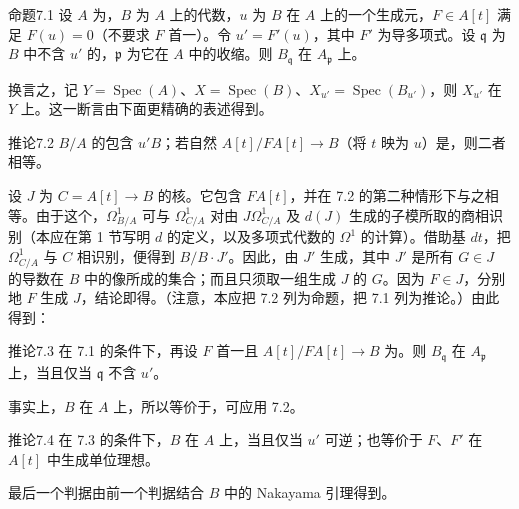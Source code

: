 \begin{SGAresult}{命题}{7.1}
设 $A$ 为，$B$ 为 $A$ 上的代数，$u$ 为 $B$ 在 $A$ 上的一个生成元，$F\in A[t]$ 满足 $F(u)=0$（不要求 $F$ 首一）。令 $u'=F'(u)$，其中 $F'$ 为导多项式。设 $\mathfrak q$ 为 $B$ 中不含 $u'$ 的，$\mathfrak p$ 为它在 $A$ 中的收缩。则 $B_{\mathfrak q}$ 在 $A_{\mathfrak p}$ 上。
\end{SGAresult}
换言之，记 $Y=\operatorname{Spec}(A)$、$X=\operatorname{Spec}(B)$、$X_{u'}=\operatorname{Spec}(B_{u'})$，则 $X_{u'}$ 在 $Y$ 上。这一断言由下面更精确的表述得到。
\begin{SGAresult}{推论}{7.2}
$B/A$ 的包含 $u'B$；若自然 $A[t]/FA[t]\to B$（将 $t$ 映为 $u$）是，则二者相等。
\end{SGAresult}
设 $J$ 为 $C=A[t]\to B$ 的核。它包含 $FA[t]$，并在 7.2 的第二种情形下与之相等。由于这个，$\Omega^1_{B/A}$ 可与 $\Omega^1_{C/A}$ 对由 $J\Omega^1_{C/A}$ 及 $d(J)$ 生成的子模所取的商相识别（本应在第 1 节写明 $d$ 的定义，以及多项式代数的 $\Omega^1$ 的计算）。借助基 $dt$，把 $\Omega^1_{C/A}$ 与 $C$ 相识别，便得到 $B/B\cdot J'$。因此，由 $J'$ 生成，其中 $J'$ 是所有 $G\in J$ 的导数在 $B$ 中的像所成的集合；而且只须取一组生成 $J$ 的 $G$。因为 $F\in J$，分别地 $F$ 生成 $J$，结论即得。（注意，本应把 7.2 列为命题，把 7.1 列为推论。）由此得到：
\begin{SGAresult}{推论}{7.3}
在 7.1 的条件下，再设 $F$ 首一且 $A[t]/FA[t]\to B$ 为。则 $B_{\mathfrak q}$ 在 $A_{\mathfrak p}$ 上，当且仅当 $\mathfrak q$ 不含 $u'$。
\end{SGAresult}
事实上，$B$ 在 $A$ 上，所以等价于，可应用 7.2。
\begin{SGAresult}{推论}{7.4}
在 7.3 的条件下，$B$ 在 $A$ 上，当且仅当 $u'$ 可逆；也等价于 $F$、$F'$ 在 $A[t]$ 中生成单位理想。
\end{SGAresult}
最后一个判据由前一个判据结合 $B$ 中的 Nakayama 引理得到。

